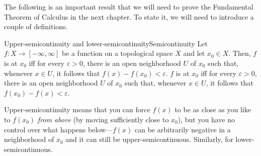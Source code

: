The following is an important result that we will need to prove the Fundamental Theorem of Calculus in the next chapter.  To state it, we will need to introduce a couple of definitions.
\begin{dfn}{Upper-semicontinuity and lo\-wer-se\-mi\-con\-tin\-u\-ity}{Semicontinuity}
Let $f\colon X\rightarrow [-\infty ,\infty ]$ be a function on a topological space $X$ and let $x_0\in X$.  Then, $f$ is  at $x_0$ iff for every $\varepsilon >0$, there is an open neighborhood $U$ of $x_0$ such that, whenever $x\in U$, it follows that $f(x)-f(x_0)<\varepsilon$.  $f$ is  at $x_0$ iff for every $\varepsilon >0$, there is an open neighborhood $U$ of $x_0$ such that, whenever $x\in U$, it follows that $f(x_0)-f(x)<\varepsilon $.
\begin{rmk}
Upper-semicontinuity means that you can force $f(x)$ to be as close as you like to $f(x_0)$ \emph{from above} (by moving sufficiently close to $x_0$), but you have no control over what happens below---$f(x)$ can be arbitrarily negative in a neighborhood of $x_0$ and it can still be upper-semicontinuous.  Similarly, for lower-semicontinuous.
\end{rmk}
\end{dfn}
